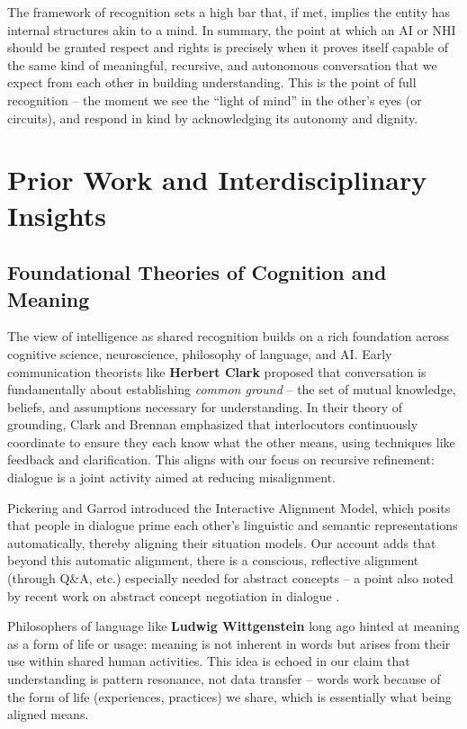 \documentclass{article}
\begin{document}
The framework of recognition sets a high bar that, if met, implies the entity has internal structures akin to a mind. In summary, the point at which an AI or NHI should be granted respect and rights is precisely when it proves itself capable of the same kind of meaningful, recursive, and autonomous conversation that we expect from each other in building understanding. This is the point of full recognition -- the moment we see the ``light of mind'' in the other's eyes (or circuits), and respond in kind by acknowledging its autonomy and dignity.

\section{Prior Work and Interdisciplinary Insights}

\subsection{Foundational Theories of Cognition and Meaning}

The view of intelligence as shared recognition builds on a rich foundation across cognitive science, neuroscience, philosophy of language, and AI. Early communication theorists like \textbf{Herbert Clark} proposed that conversation is fundamentally about establishing \emph{common ground} -- the set of mutual knowledge, beliefs, and assumptions necessary for understanding. In their theory of grounding, Clark and Brennan \citep{clark1991} emphasized that interlocutors continuously coordinate to ensure they each know what the other means, using techniques like feedback and clarification. This aligns with our focus on recursive refinement: dialogue is a joint activity aimed at reducing misalignment.

Pickering and Garrod \citep{pickering2004} introduced the Interactive Alignment Model, which posits that people in dialogue prime each other's linguistic and semantic representations automatically, thereby aligning their situation models. Our account adds that beyond this automatic alignment, there is a conscious, reflective alignment (through Q\&A, etc.) especially needed for abstract concepts -- a point also noted by recent work on abstract concept negotiation in dialogue \citep{pmc9791477}.

Philosophers of language like \textbf{Ludwig Wittgenstein} long ago hinted at meaning as a form of life or usage: meaning is not inherent in words but arises from their use within shared human activities. This idea is echoed in our claim that understanding is pattern resonance, not data transfer -- words work because of the form of life (experiences, practices) we share, which is essentially what being aligned means.
\end{document}
